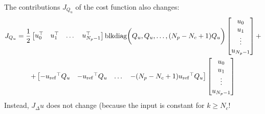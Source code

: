 \documentclass[a4paper,12pt,fleqn]{article}
\newcommand{\Np}{{N_p}}
\newcommand{\Nc}{{N_c}}
\newcommand{\blkdiag}{\text{blkdiag}}
\begin{document}
The contributions $J_{Q_u}$ of the cost function also changes:
\begin{multline}
\label{eq:J_Qu_Nc}
 J_{Q_u} = \frac{1}{2}
 \begin{bmatrix}
  u_0^\top & u_1^\top &\dots & u_{\Np-1}^\top
 \end{bmatrix}
 \blkdiag\bigg(Q_u, Q_u, \dots, (\Np - \Nc + 1)Q_u\bigg)
 \begin{bmatrix}
  u_0 \\  u_1\\ \vdots\\  u_{\Np-1}
 \end{bmatrix}
  + \\
 +
  \begin{bmatrix}
  -{u_{\rm ref}}^\top Q_u & -{u_{\rm ref}}^\top Q_u &\dots & -(\Np - \Nc + 1){u_{\rm ref}}^\top Q_u
 \end{bmatrix}
 \begin{bmatrix}
  u_0 \\ u_1 \\ \vdots \\ u_{\Np-1}
 \end{bmatrix}
 \end{multline}
Instead, $J_\Delta u$ does not change (because the input is constant for $k \geq N_c$!
\end{document}
